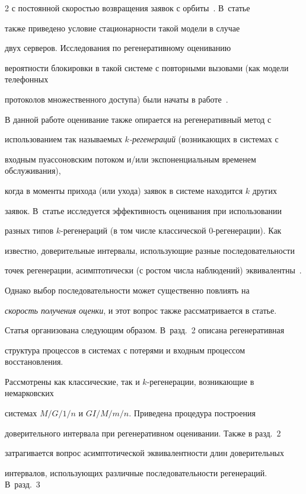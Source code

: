\begin{multicols}{2}
с  постоянной скоростью возвращения заявок с орбиты~\cite{Avr}.   \mbox{В~статье}


также приведено условие стационарности такой модели в случае


двух серверов. Исследования по регенеративному оцениванию


вероятности блокировки в такой сис\-те\-ме  с повторными вызовами  (как  модели телефонных


протоколов  множественного доступа) были начаты   в работе~\cite{Minsk}.


 В  данной работе оценивание  также  опирается на регенеративный  метод с


использованием так называемых {\it  $k$-ре\-ге\-не\-ра\-ций} (возникающих в сис\-те\-мах с


входным пуассоновским потоком и/или экспоненциальным временем обслуживания),


когда в моменты прихода (или ухода) заявок в сис\-те\-ме находится $k$ других


заявок. В~статье исследуется эффективность оценивания при использовании


разных типов $k$-ре\-ге\-не\-ра\-ций (в том числе классической $0$-ре\-ге\-не\-ра\-ции). Как


известно,  доверительные интервалы, использующие разные последовательности


точек регенерации, асимптотически (с ростом числа наблюдений) эквивалентны~\cite{Shedler}.  


Однако выбор по\-сле\-до\-ва\-тель\-ности может существенно повлиять на


{\it скорость получения оценки}, и этот вопрос также рассматривается в статье.





Статья организована следующим образом. В~разд.~2  описана регенеративная


структура процессов в сис\-те\-мах с потерями и входным процессом восстановления.


Рассмотрены как классические, так и $k$-ре\-ге\-не\-ра\-ции, возникающие в немарковских


сис\-те\-мах $M/G/1/n$ и  $GI/M/m/n$. Приведена процедура построения


доверительного интервала при регенеративном оценивании. Также в разд.~2


затрагивается вопрос асимптотической эквивалентности длин доверительных


интервалов, использующих различные последовательности  регенераций. В~разд.~3



\end{multicols}
